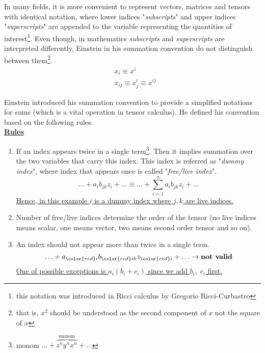 \documentclass[../main.tex]{subfiles}
\begin{document}
	\par In many fields, it is more convenient to represent vectors, matrices and tensors with identical notation, where lower indices "\textit{subscripts}" and upper indices "\textit{superscripts}" are appended to the variable representing the quantities of interest\footnote{this notation was introduced in Ricci calculus by Gregorio Ricci-Curbastro }. Even though, in mathematics \textit{subscripts} and \textit{superscripts} are interpreted differently, Einstein in his summation convention do not distinguish between them\footnote{that is, $x^2$ should be understood as the second component of $x$ not the square of $x$}.
		\begin{align*}
			& x_i \equiv x^i\\
 			& x_{ij} \equiv x^i_j \equiv x^{ij}
		\end{align*}
	\par Einstein introduced his summation convention to provide a simplified notations for sums (which is a vital operation in tensor calculus). He defined his convention based on the following rules.\\

	\noindent\textbf{\underline{Rules}}
	\begin{enumerate}
		\item If an index appears twice in a single term\footnote{monom $\hdots + \overbrace{z^n y^n x^n}^{\text{monom}} + \hdots$}. Then it implies summation over the two variables that carry this index. This index is referred as "\textit{dummy index}", where index that appears once is called "\textit{free/live index}".
			\begin{equation*}
				\hdots + a_i b_{jk} z_i + \hdots \equiv \hdots + \sum_{i=1}^{n} a_i b_{jk} z_i + \hdots
			\end{equation*}
			\underline{Hence, in this example $i$ is a dummy index where $j,k$ are live indices.}
		\item Number of free/live indices determine the order of the tensor (no live indices means scalar, one means vector, two means second order tensor and so on).
		\item An index should not appear more than twice in a single term. 
			\begin{equation*}
				\hdots + a_{\color{red}i} b_{{\color{red}i}k} z_{\color{red}i} + \hdots \rightarrow \textbf{not valid}
			\end{equation*}
			\underline{One of possible exceptions is $a_i (b_i + c_i)$ since we add $b_i, \; c_i$ first.}
	\end{enumerate}
		
\end{document}
